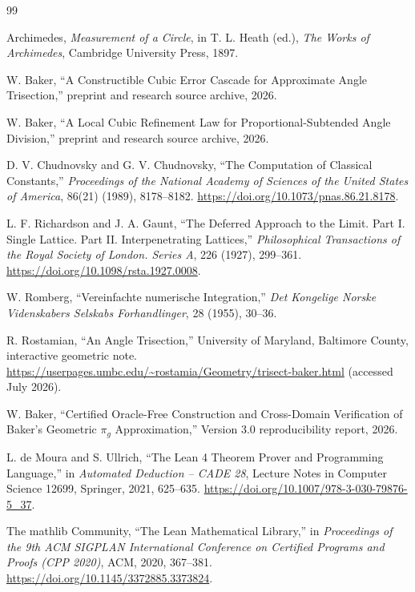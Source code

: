 \documentclass[12pt]{article}
\theoremstyle{definition}
\theoremstyle{remark}
\begin{document}
\begin{thebibliography}{99}

Archimedes,
\textit{Measurement of a Circle},
in T. L. Heath (ed.), \textit{The Works of Archimedes},
Cambridge University Press, 1897.

W. Baker,
``A Constructible Cubic Error Cascade for Approximate Angle Trisection,''
preprint and research source archive, 2026.

W. Baker,
``A Local Cubic Refinement Law for Proportional-Subtended Angle Division,''
preprint and research source archive, 2026.

D. V. Chudnovsky and G. V. Chudnovsky,
``The Computation of Classical Constants,''
\textit{Proceedings of the National Academy of Sciences of the United States
of America}, 86(21) (1989), 8178--8182.
\url{https://doi.org/10.1073/pnas.86.21.8178}.

L. F. Richardson and J. A. Gaunt,
``The Deferred Approach to the Limit. Part I. Single Lattice. Part II.
Interpenetrating Lattices,''
\textit{Philosophical Transactions of the Royal Society of London. Series A},
226 (1927), 299--361.
\url{https://doi.org/10.1098/rsta.1927.0008}.

W. Romberg,
``Vereinfachte numerische Integration,''
\textit{Det Kongelige Norske Videnskabers Selskabs Forhandlinger},
28 (1955), 30--36.

R. Rostamian,
``An Angle Trisection,''
University of Maryland, Baltimore County, interactive geometric note.
\url{https://userpages.umbc.edu/~rostamia/Geometry/trisect-baker.html}
(accessed July 2026).

W. Baker,
``Certified Oracle-Free Construction and Cross-Domain Verification of
Baker's Geometric $\pi_g$ Approximation,''
Version 3.0 reproducibility report, 2026.

L. de Moura and S. Ullrich,
``The Lean 4 Theorem Prover and Programming Language,''
in \textit{Automated Deduction -- CADE 28},
Lecture Notes in Computer Science 12699, Springer, 2021, 625--635.
\url{https://doi.org/10.1007/978-3-030-79876-5_37}.

The mathlib Community,
``The Lean Mathematical Library,''
in \textit{Proceedings of the 9th ACM SIGPLAN International Conference on
Certified Programs and Proofs (CPP 2020)},
ACM, 2020, 367--381.
\url{https://doi.org/10.1145/3372885.3373824}.


\end{thebibliography}
\end{document}
